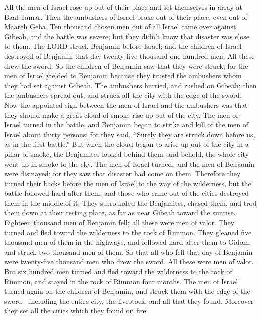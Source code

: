 \myverse{}All the men of Israel rose up out of their place and set themselves
in array at Baal Tamar. Then the ambushers of Israel broke out of their place, even out of Maareh Geba.
\myverse{}Ten thousand chosen men out of all Israel came over against Gibeah, and the
battle was severe; but they didn’t know that disaster was close to them.
\myverse{}The LORD struck Benjamin before Israel; and the children of Israel destroyed
of Benjamin that day twenty-five thousand one hundred men. All these drew the sword.
\myverse{}So the children of Benjamin saw that they were struck, for the men of Israel
yielded to Benjamin because they trusted the ambushers whom they had set against Gibeah.
\myverse{}The ambushers hurried, and rushed on Gibeah; then the ambushers spread out,
and struck all the city with the edge of the sword.
\myverse{}Now the appointed sign between the men of Israel and the ambushers was that
they should make a great cloud of smoke rise up out of the city.
\myverse{}The men of Israel turned in the battle, and Benjamin began to strike and
kill of the men of Israel about thirty persons; for they said, “Surely they are struck down before us,
as in the first battle.”
\myverse{}But when the cloud began to arise up out of the city in a pillar of smoke,
the Benjamites looked behind them; and behold, the whole city went up in smoke to the sky.
\myverse{}The men of Israel turned, and the men of Benjamin were dismayed; for they
saw that disaster had come on them.
\myverse{}Therefore they turned their backs before the men of Israel to the way of
the wilderness, but the battle followed hard after them; and those who came out of the cities destroyed
them in the middle of it.
\myverse{}They surrounded the Benjamites, chased them, and trod them down at their
resting place, as far as near Gibeah toward the sunrise.
\myverse{}Eighteen thousand men of Benjamin fell; all these were men of valor.
\myverse{}They turned and fled toward the wilderness to the rock of Rimmon. They gleaned
five thousand men of them in the highways, and followed hard after them to Gidom, and struck two thousand
men of them.
\myverse{}So that all who fell that day of Benjamin were twenty-five thousand men who
drew the sword. All these were men of valor.
\myverse{}But six hundred men turned and fled toward the wilderness to the rock of
Rimmon, and stayed in the rock of Rimmon four months.
\myverse{}The men of Israel turned again on the children of Benjamin, and struck them
with the edge of the sword—including the entire city, the livestock, and all that they found. Moreover
they set all the cities which they found on fire.


